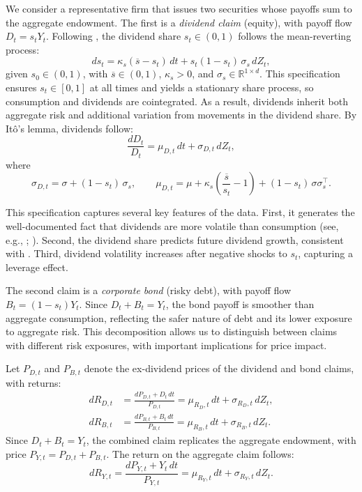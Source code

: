 \documentclass[12pt,english]{article}
\begin{document}
We consider a representative firm that issues two securities whose payoffs sum to the aggregate endowment.
The first is a \emph{dividend claim} (equity), with payoff flow $D_t = s_t Y_t$.
Following \citet{MenzlySantosVeronesi2004}, the dividend share $s_t \in (0,1)$ follows the mean-reverting process:
\begin{equation}\label{eq:s_process}
    ds_t = \kappa_s(\overline{s} - s_t)\,dt + s_t(1-s_t)\,\sigma_s\,dZ_t,
\end{equation}
given $s_0 \in (0,1)$, with $\overline{s} \in (0,1)$, $\kappa_s > 0$, and $\sigma_s \in \mathbb{R}^{1\times d}$.
This specification ensures $s_t \in [0,1]$ at all times and yields a stationary share process, so consumption and dividends are cointegrated.
As a result, dividends inherit both aggregate risk and additional variation from movements in the dividend share.
By It\^{o}'s lemma, dividends follow:
\begin{equation}\label{eq:D_dynamics}
    \frac{dD_t}{D_t} = \mu_{D,t}\,dt + \sigma_{D,t}\,dZ_t,
\end{equation}
where
\begin{equation}\label{eq:D_vol}
    \sigma_{D,t} = \sigma + (1-s_t)\,\sigma_s, \qquad 
    \mu_{D,t} = \mu + \kappa_s\!\left(\frac{\overline{s}}{s_t}-1\right) + (1-s_t)\,\sigma\sigma_s^\top.
\end{equation}

This specification captures several key features of the data.
First, it generates the well-documented fact that dividends are more volatile than consumption (see, e.g., \citealt{abel1999risk}; \citealt{Campbell1999AssetPrices}).
Second, the dividend share predicts future dividend growth, consistent with \citet{MenzlySantosVeronesi2004}.
Third, dividend volatility increases after negative shocks to $s_t$, capturing a leverage effect.

The second claim is a \emph{corporate bond} (risky debt), with payoff flow $B_t = (1-s_t)Y_t$. 
Since $D_t + B_t = Y_t$, the bond payoff is smoother than aggregate consumption, reflecting the safer nature of debt and its lower exposure to aggregate risk.
This decomposition allows us to distinguish between claims with different risk exposures, with important implications for price impact.

Let $P_{D,t}$ and $P_{B,t}$ denote the ex-dividend prices of the dividend and bond claims, with returns:
\begin{align}
    dR_{D,t} &= \frac{dP_{D,t}+D_t\,dt}{P_{D,t}}
    = \mu_{R_D,t}\,dt+\sigma_{R_D,t}\,dZ_t, \label{eq:RD_def}\\
    dR_{B,t} &= \frac{dP_{B,t}+B_t\,dt}{P_{B,t}}
    = \mu_{R_B,t}\,dt+\sigma_{R_B,t}\,dZ_t. \label{eq:RB_def}
\end{align}
Since $D_t+B_t=Y_t$, the combined claim replicates the aggregate endowment, with price $P_{Y,t} = P_{D,t}+P_{B,t}$. 
The return on the aggregate claim follows:
\begin{equation}\label{eq:risky-asset-ret}
    dR_{Y,t} = \frac{dP_{Y,t}+Y_t\,dt}{P_{Y,t}} = \mu_{R_Y,t}\,dt + \sigma_{R_Y,t}\,dZ_t.
\end{equation}
\end{document}
